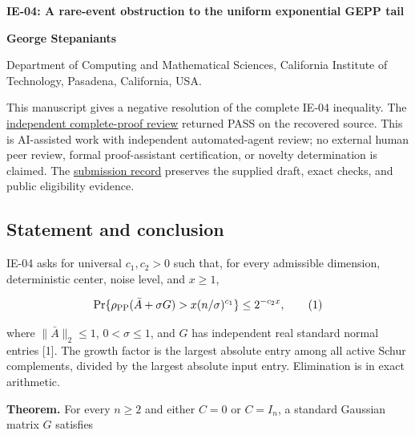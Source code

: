 \documentclass[10pt,a4paper]{article}
\begin{document}
{\raggedright\Large\bfseries IE-04: A rare-event obstruction to the
uniform exponential GEPP tail\par}
\vspace{0.4em}
{\normalsize\bfseries George Stepaniants\par}
{\small Department of Computing and Mathematical Sciences, California
Institute of Technology, Pasadena, California, USA.\par}

\vspace{0.6em}
\pagestyle{plain}
\setlength{\abovedisplayskip}{6pt}
\setlength{\belowdisplayskip}{6pt}
\setlength{\abovedisplayshortskip}{4pt}
\setlength{\belowdisplayshortskip}{4pt}

This manuscript gives a negative resolution of the complete IE-04
inequality. The
\href{https://github.com/ajt60gaibb/OpenProblemsInNLA/blob/main/references/stepaniants-ie04-2026-09-11/verification/IE-04-independent-review.md}{independent
complete-proof review} returned PASS on the recovered source. This is
AI-assisted work with independent automated-agent review; no external
human peer review, formal proof-assistant certification, or novelty
determination is claimed. The
\href{https://github.com/ajt60gaibb/OpenProblemsInNLA/blob/main/references/stepaniants-ie04-2026-09-11/README.md}{submission
record} preserves the supplied draft, exact checks, and public
eligibility evidence.

\subsection{Statement and conclusion}\label{statement-and-conclusion}

IE-04 asks for universal \(c_1,c_2>0\) such that, for every admissible
dimension, deterministic center, noise level, and \(x\geq1\),

\nopagebreak[4]

\[
\Pr\{\rho_{\rm PP}(\bar A+\sigma G)>x(n/\sigma)^{c_1}\}
\leq 2^{-c_2x},
\tag{1}
\]

where \(\|\bar A\|_2\leq1\), \(0<\sigma\leq1\), and \(G\) has
independent real standard normal entries {[}1{]}. The growth factor is
the largest absolute entry among all active Schur complements, divided
by the largest absolute input entry. Elimination is in exact arithmetic.

\textbf{Theorem.} For every \(n\geq2\) and either \(C=0\) or \(C=I_n\),
a standard Gaussian matrix \(G\) satisfies

\nopagebreak[4]
\end{document}
